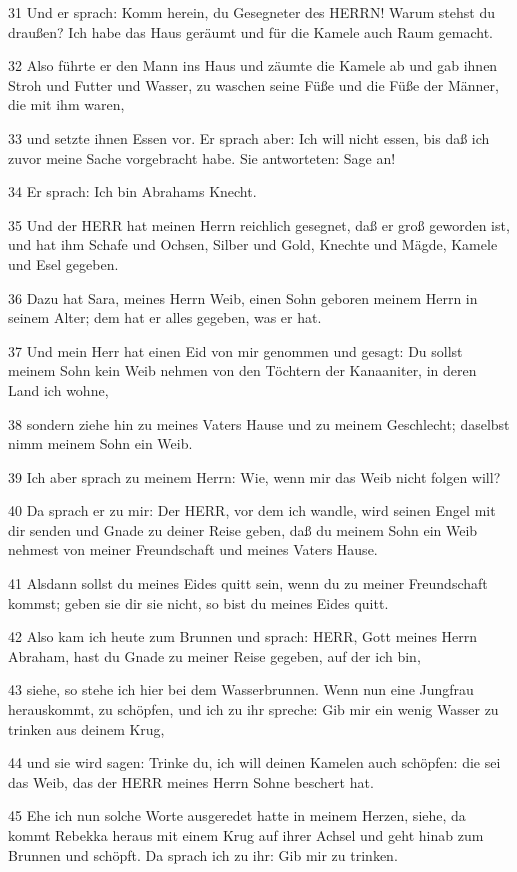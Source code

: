 \par 31 Und er sprach: Komm herein, du Gesegneter des HERRN! Warum stehst du draußen? Ich habe das Haus geräumt und für die Kamele auch Raum gemacht.
\par 32 Also führte er den Mann ins Haus und zäumte die Kamele ab und gab ihnen Stroh und Futter und Wasser, zu waschen seine Füße und die Füße der Männer, die mit ihm waren,
\par 33 und setzte ihnen Essen vor. Er sprach aber: Ich will nicht essen, bis daß ich zuvor meine Sache vorgebracht habe. Sie antworteten: Sage an!
\par 34 Er sprach: Ich bin Abrahams Knecht.
\par 35 Und der HERR hat meinen Herrn reichlich gesegnet, daß er groß geworden ist, und hat ihm Schafe und Ochsen, Silber und Gold, Knechte und Mägde, Kamele und Esel gegeben.
\par 36 Dazu hat Sara, meines Herrn Weib, einen Sohn geboren meinem Herrn in seinem Alter; dem hat er alles gegeben, was er hat.
\par 37 Und mein Herr hat einen Eid von mir genommen und gesagt: Du sollst meinem Sohn kein Weib nehmen von den Töchtern der Kanaaniter, in deren Land ich wohne,
\par 38 sondern ziehe hin zu meines Vaters Hause und zu meinem Geschlecht; daselbst nimm meinem Sohn ein Weib.
\par 39 Ich aber sprach zu meinem Herrn: Wie, wenn mir das Weib nicht folgen will?
\par 40 Da sprach er zu mir: Der HERR, vor dem ich wandle, wird seinen Engel mit dir senden und Gnade zu deiner Reise geben, daß du meinem Sohn ein Weib nehmest von meiner Freundschaft und meines Vaters Hause.
\par 41 Alsdann sollst du meines Eides quitt sein, wenn du zu meiner Freundschaft kommst; geben sie dir sie nicht, so bist du meines Eides quitt.
\par 42 Also kam ich heute zum Brunnen und sprach: HERR, Gott meines Herrn Abraham, hast du Gnade zu meiner Reise gegeben, auf der ich bin,
\par 43 siehe, so stehe ich hier bei dem Wasserbrunnen. Wenn nun eine Jungfrau herauskommt, zu schöpfen, und ich zu ihr spreche: Gib mir ein wenig Wasser zu trinken aus deinem Krug,
\par 44 und sie wird sagen: Trinke du, ich will deinen Kamelen auch schöpfen: die sei das Weib, das der HERR meines Herrn Sohne beschert hat.
\par 45 Ehe ich nun solche Worte ausgeredet hatte in meinem Herzen, siehe, da kommt Rebekka heraus mit einem Krug auf ihrer Achsel und geht hinab zum Brunnen und schöpft. Da sprach ich zu ihr: Gib mir zu trinken.
